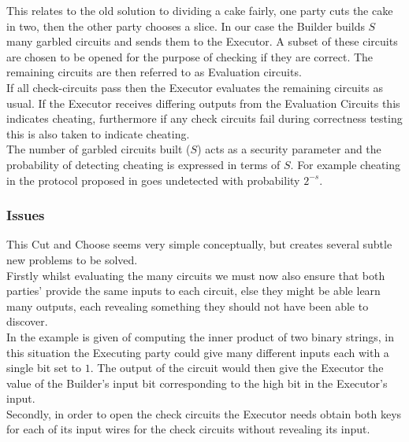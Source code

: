 \documentclass[ %
                    author={Nicholas Tutte},
                supervisor={Prof. Nigel Smart},
                    degree={MEng},
                     title={Secure Two Party Computation},
                  subtitle={A practical comparison of recent protocols},
                      type={Research - GG1K},
                      year={2015} ]{dissertation}
\begin{document}
				This relates to the old solution to dividing a cake fairly, one party cuts the cake in two, then the other party chooses a slice. In our case the Builder builds $S$ many garbled circuits and sends them to the Executor. A subset of these circuits are chosen to be opened for the purpose of checking if they are correct. The remaining circuits are then referred to as Evaluation circuits.\\

				If all check-circuits pass then the Executor evaluates the remaining circuits as usual. If the Executor receives differing outputs from the Evaluation Circuits this indicates cheating, furthermore if any check circuits fail during correctness testing this is also taken to indicate cheating.\\

				The number of garbled circuits built ($S$) acts as a security parameter and the probability of detecting cheating is expressed in terms of $S$. For example cheating in the protocol proposed in \cite{Lindell_CnC_2013} goes undetected with probability $2^{-s}$.\\

			\subsubsection{Issues}
				This Cut and Choose seems very simple conceptually, but creates several subtle new problems to be solved.\\

				Firstly whilst evaluating the many circuits we must now also ensure that both parties' provide the same inputs to each circuit, else they might be able learn many outputs, each revealing something they should not have been able to discover.\\

				In \cite{LindellAndPinkas2007} the example is given of computing the inner product of two binary strings, in this situation the Executing party could give many different inputs each with a single bit set to $1$. The output of the circuit would then give the Executor the value of the Builder's input bit corresponding to the high bit in the Executor's input.\\

				Secondly, in order to open the check circuits the Executor needs obtain both keys for each of its input wires for the check circuits without revealing its input.\\
\end{document}
